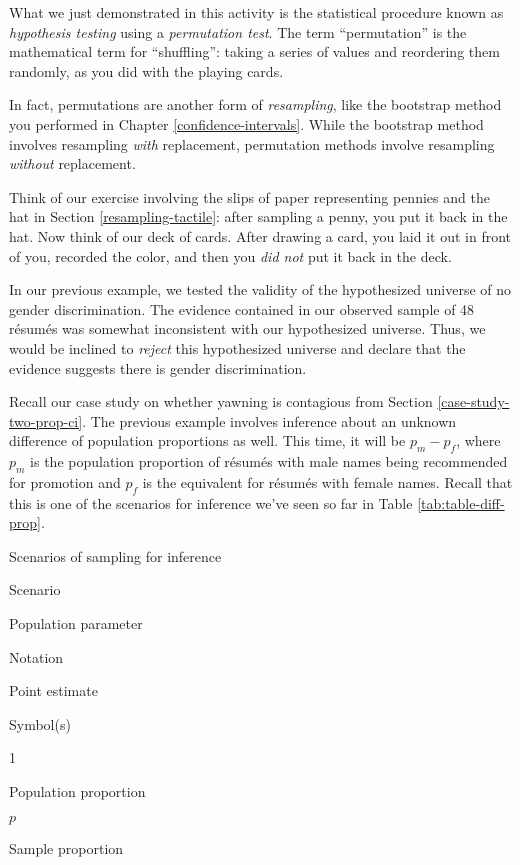 \documentclass[
]{book}
\begin{document}
What we just demonstrated in this activity is the statistical procedure known as \emph{hypothesis testing} using a \emph{permutation test}. The term ``permutation''  is the mathematical term for ``shuffling'': taking a series of values and reordering them randomly, as you did with the playing cards.

In fact, permutations are another form of \emph{resampling}, like the bootstrap method you performed in Chapter \ref{confidence-intervals}. While the bootstrap method involves resampling \emph{with} replacement, permutation methods involve resampling \emph{without} replacement.

Think of our exercise involving the slips of paper representing pennies and the hat in Section \ref{resampling-tactile}: after sampling a penny, you put it back in the hat. Now think of our deck of cards. After drawing a card, you laid it out in front of you, recorded the color, and then you \emph{did not} put it back in the deck.

In our previous example, we tested the validity of the hypothesized universe of no gender discrimination. The evidence contained in our observed sample of 48 résumés was somewhat inconsistent with our hypothesized universe. Thus, we would be inclined to \emph{reject} this hypothesized universe and declare that the evidence suggests there is gender discrimination.

Recall our case study on whether yawning is contagious from Section \ref{case-study-two-prop-ci}. The previous example involves inference about an unknown difference of population proportions as well. This time, it will be \(p_{m} - p_{f}\), where \(p_{m}\) is the population proportion of résumés with male names being recommended for promotion and \(p_{f}\) is the equivalent for résumés with female names. Recall that this is one of the scenarios for inference we've seen so far in Table \ref{tab:table-diff-prop}.

\label{tab:table-diff-prop}Scenarios of sampling for inference

Scenario

Population parameter

Notation

Point estimate

Symbol(s)

1

Population proportion

\(p\)

Sample proportion
\end{document}
